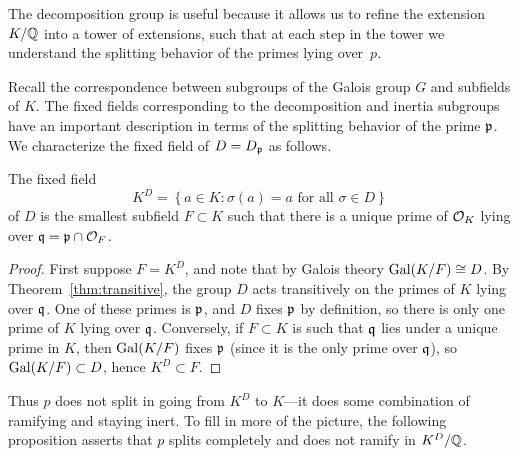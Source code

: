 The decomposition group is useful because it allows us
to refine the extension $K/\mathbb{Q}$ into a tower of extensions, such that at
each step in the tower we understand the splitting behavior
of the primes lying over~$p$.

Recall the correspondence between subgroups of the Galois group
$G$ and subfields of $K$. The fixed fields corresponding to the
decomposition and inertia subgroups have an important description
in terms of the splitting behavior of the prime $\mathfrak{p}$.
We characterize the fixed field of $D=D_{\mathfrak{p}}$ as follows.

\begin{proposition}\label{prop:nosplit}
	The fixed field
	$$
		K^D = \left\{a \in K \colon \sigma(a) = a\text{ for all }\sigma \in D\right\}
	$$
	of $D$ is the smallest subfield $F \subset K$ such that
	there is a unique prime of $\mathcal{O}_K$ lying over $\mathfrak{q} = \mathfrak{p}\cap\mathcal{O}_F$.
\end{proposition}
\begin{proof}
	First suppose $F = K^D$, and note that by Galois theory
	$\operatorname{Gal}(K/F)\cong D$. By Theorem~\ref{thm:transitive}, the group $D$
	acts transitively on the primes of $K$ lying over $\mathfrak{q}$.  One of
	these primes is $\mathfrak{p}$, and $D$ fixes $\mathfrak{p}$ by definition, so there is
	only one prime of $K$ lying over $\mathfrak{q}$.
	Conversely, if $F\subset K$ is such that $\mathfrak{q}$ lies under a unique prime
	in $K$, then $\operatorname{Gal}(K/F)$ fixes $\mathfrak{p}$ (since it is the only
	prime over $\mathfrak{q}$), so $\operatorname{Gal}(K/F) \subset D$, hence $K^D \subset F$.
\end{proof}

Thus $p$ does not split in going from $K^D$ to $K$---it does some
combination of ramifying and staying inert.
To fill in more of the picture, the following proposition asserts that $p$
splits completely and does not ramify in $K^D/\mathbb{Q}$.

